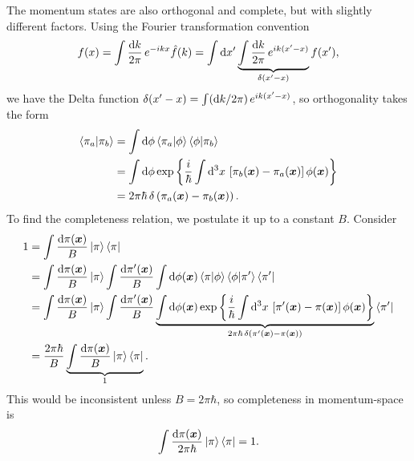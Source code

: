 The momentum states are also orthogonal and complete, but with slightly different factors.
Using the Fourier transformation convention
\begin{equation}
	f(x) = \int \frac{\mathop{}\!\mathrm{d} k}{2 \pi} \, e^{-i k x} \hat{f}(k)
	     = \int \mathop{}\!\mathrm{d} x' \underbrace{\int \frac{\mathop{}\!\mathrm{d} k}{2 \pi} \, e^{i k (x'-x)}}_{\delta(x'-x)} f(x') ,
\end{equation}
we have the Delta function $\delta(x'-x) = \int (\mathop{}\!\mathrm{d} k / 2 \pi) \, e^{i k (x'-x)}$, so orthogonality takes the form
\begin{equation}
\begin{split}
	\braket{\pi_a | \pi_b} &= \int \mathop{}\!\mathrm{d} \phi \braket{\pi_a | \phi} \braket{\phi | \pi_b} \\
	                       &= \int \mathop{}\!\mathrm{d} \phi \exp \left\{ \frac{i}{\hbar} \int \mathop{}\!\mathrm{d}^3 x \, \left[ \pi_b({\bm{x}}) - \pi_a({\bm{x}}) \right] \phi({\bm{x}}) \right\} \\
						   &= 2 \pi \hbar \, \delta \left( \pi_a({\bm{x}}) - \pi_b({\bm{x}}) \right) .
\end{split}
\end{equation}
To find the completeness relation, we postulate it up to a constant $B$.
Consider
\begin{equation}
\begin{split}
	1 &= \int \frac{\dif \pi(\vec{x})}{B} \ket{\pi} \bra{\pi} \\
	  &= \int \frac{\dif \pi(\vec{x})}{B} \ket{\pi} \int \frac{\dif \pi'(\vec{x})}{B} \int \dif \phi(\vec{x}) \braket{\pi | \phi} \braket{\phi | \pi'} \bra{\pi'} \\
	  &= \int \frac{\dif \pi(\vec{x})}{B} \ket{\pi} \int \frac{\dif \pi'(\vec{x})}{B} \underbrace{\int \dif \phi(\vec{x}) \exp \left\{ \frac{i}{\hbar} \int \dif^3 x \, \left[ \pi'(\vec{x}) - \pi(\vec{x}) \right] \phi(\vec{x}) \right\}}_{2 \pi \hbar \, \delta \left( \pi'(\vec{x}) - \pi(\vec{x}) \right)} \bra{\pi'} \\
	  &= \frac{2 \pi \hbar}{B} \underbrace{\int \frac{\dif \pi(\vec{x})}{B} \ket{\pi} \bra{\pi}}_{1} .
\end{split}
\end{equation}
This would be inconsistent unless $B = 2 \pi \hbar$, so completeness in momentum-space is
\begin{equation}
	\int \frac{\mathop{}\!\mathrm{d} \pi({\bm{x}})}{2 \pi \hbar} \ket{\pi} \bra{\pi} = 1 .
\end{equation}

